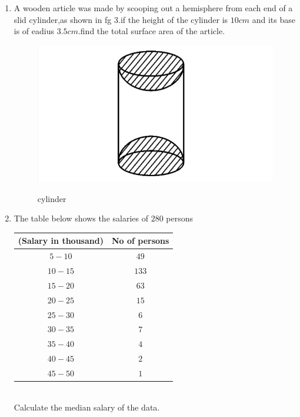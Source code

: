 \documentclass{article}
\begin{document}
\begin{enumerate}
		\item A wooden article was made by scooping out a hemisphere from each end of a slid cylinder,as shown in fg 3.if the height of the cylinder is $10cm$ and its base is of eadius $3.5cm$.find the total surface area of the article.\\
			\begin{figure}[H]                                                            \centering                                                             \includegraphics [width=\columnwidth] {./IMG2.jpg}                     \label{fig:fig1}                                                       \caption{cylinder}
			\end{figure}

	\item The table below shows the salaries of $280$ persons\\     \begin{tabular}{|c|c|}                                                                        \hline                                                                 (Salary in thousand\rupee) & No of persons\\ \hline                                                                                           $5-10$ & $49$\\ \hline                                                 $10-15$ & $133$\\ \hline                                               $15-20$ & $63$\\ \hline                                                $20-25$ & $15$\\ \hline                                                $25-30$ & $6$\\ \hline                                                 $30-35$ & $7$\\ \hline                                                 $35-40$ & $4$\\ \hline                                                 $40-45$ & $2$\\ \hline                                                 $45-50$ & $1$\\ \hline                                         \end{tabular}\\                                                        Calculate the median salary of the data.
					

\end{enumerate}
\end{document}
